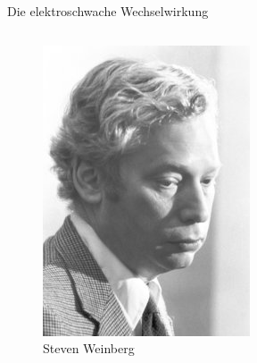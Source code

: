 \documentclass[aspectratio=1610, professionalfonts, 10pt]{beamer}
\begin{document}
\begin{frame}{Die elektroschwache Wechselwirkung}
\begin{columns}
\begin{figure}
				\includegraphics[width=\linewidth]{Images/weinberg-13320-content-portrait-mobile-tiny.jpg}
	  			\caption{Steven Weinberg}
	  			\label{fig:fermi}
			\end{figure}
			\begin{figure}
	  			\centering

\end{figure}
\end{columns}
\end{frame}
\end{document}
